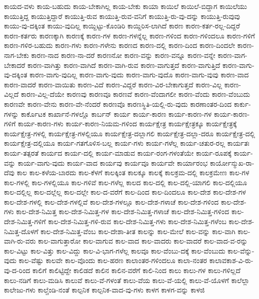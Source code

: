 {ಕಾಯದ-ವಳು
ಕಾಯ-ಬಹುದು
ಕಾಯ-ಬೇಕಾಗಿಲ್ಲ
ಕಾಯ-ಬೇಕು
ಕಾಯಾ
ಕಾಯಿಲೆ
ಕಾಯಿಲೆ-ಬಿದ್ದಾಗ
ಕಾಯಿಲೆಯು
ಕಾಯುತ್ತಿದ್ದ
ಕಾಯುತ್ತಿದ್ದಾರೆ
ಕಾಯುತ್ತಿ-ರುವ
ಕಾಯುತ್ತಿ-ರುವ-ವನಿಗೆ
ಕಾಯುತ್ತಿ-ರು-ವು-ದನ್ನು
ಕಾಯುತ್ತಿ-ರುವುವು
ಕಾಯು-ವು-ದಕ್ಕಿಂತ
ಕಾಯು-ವುದಿಲ್ಲ
ಕಾಯ್ದಿಟ್ಟು-ಕೊಂಡಿರಿ
ಕಾಯ್ದಿರಿಸ-ಲಾಗಿದೆ
ಕಾರಣ
ಕಾರಣ-ಕರ್ತ-ರಲ್ಲ-ದಿದ್ದರೆ
ಕಾರಣ-ಕರ್ತರು
ಕಾರಣಕ್ಕಾಗಿ
ಕಾರಣಕ್ಕೆ
ಕಾರಣ-ಗಳ
ಕಾರಣ-ಗಳನ್ನೆಲ್ಲ
ಕಾರಣ-ಗಳಿಂದ
ಕಾರಣ-ಗಳಿಂದಲೂ
ಕಾರಣ-ಗಳಿಗೆ
ಕಾರಣ-ಗಳಿರ-ಬಹುದು
ಕಾರಣ-ಗಳು
ಕಾರಣ-ಗಳೇನು
ಕಾರಣದ
ಕಾರಣ-ದಲ್ಲಿ
ಕಾರಣ-ದಿಂದ
ಕಾರಣ-ದಿಂದಲೇ
ಕಾರಣ-ನಾಗ-ಬೇಕು
ಕಾರಣ-ನಾದ
ಕಾರಣ-ನಾ-ದರೆ
ಕಾರಣನೋ
ಕಾರಣ-ವನ್ನು
ಕಾರಣ-ವನ್ನೂ
ಕಾರಣ-ವನ್ನೇ
ಕಾರಣ-ವಾಗ-ಬೇಕಾದರೆ
ಕಾರಣ-ವಾಗಿತ್ತು
ಕಾರಣ-ವಾಗಿದೆ
ಕಾರಣ-ವಾಗಿ-ರುವ
ಕಾರಣ-ವಾಗುತ್ತದೆ
ಕಾರಣ-ವಾಗುತ್ತಿದೆ
ಕಾರಣ-ವಾಗು-ವು-ದಕ್ಕಿಂತ
ಕಾರಣ-ವಾಗು-ವುದಿಲ್ಲ
ಕಾರಣ-ವಾಗು-ವುದು
ಕಾರಣ-ವಾಗು-ವುದೊ
ಕಾರಣ-ವಾಗು-ವುವು
ಕಾರಣ-ವಾದ
ಕಾರಣ-ವಾದರೆ
ಕಾರಣ-ವಾಯಿತು
ಕಾರಣ-ವಿದೆ
ಕಾರಣ-ವಿದ್ದರೆ
ಕಾರಣ-ವಿರ-ಬೇಕಾಗುತ್ತದೆ
ಕಾರಣ-ವಿಲ್ಲ
ಕಾರಣ-ವಿಲ್ಲದೆ
ಕಾರಣ-ವಿಲ್ಲ-ದೆಯೇ
ಕಾರಣವು
ಕಾರಣವೂ
ಕಾರಣವೆ
ಕಾರಣ-ವೆಂದಾಗಲೀ
ಕಾರಣ-ವೆಂದು
ಕಾರಣ-ವೆಂಬುದು
ಕಾರಣವೇ
ಕಾರಣ-ವೇನು
ಕಾರಣ-ವೇ-ನೆಂದರೆ
ಕಾರಣವೊ
ಕಾರಣಸ್ಥಿತಿ-ಯಲ್ಲಿ-ರು-ವುದು
ಕಾರಣಾಂತರ-ದಿಂದ
ಕಾರ್ಕು-ಗಳನ್ನು
ಕಾರ್ಕೊಟಕ
ಕಾರ್ಖಾನೆ-ಗಳಲ್ಲೊ
ಕಾರ್ಬನ್
ಕಾರ್ಯ
ಕಾರ್ಯ-ಕಾರಣ
ಕಾರ್ಯ-ಕಾರಣ-ಗಳ
ಕಾರ್ಯ-ಕಾರಣ-ಗಳಿಗೆ
ಕಾರ್ಯ-ಕಾರಣ-ಗಳು
ಕಾರ್ಯ-ಕಾರಣ-ನಿಯಮ-ಗಳಿಂದ
ಕಾರ್ಯಕ್ಷೇತ್ರ
ಕಾರ್ಯಕ್ಷೇತ್ರಕ್ಕೂ
ಕಾರ್ಯಕ್ಷೇತ್ರಕ್ಕೆ
ಕಾರ್ಯಕ್ಷೇತ್ರ-ಗಳಲ್ಲಿ
ಕಾರ್ಯಕ್ಷೇತ್ರ-ಗಳಲ್ಲಿಯೂ
ಕಾರ್ಯಕ್ಷೇತ್ರ-ದಲ್ಲಾಗಲಿ
ಕಾರ್ಯಕ್ಷೇತ್ರ-ದಲ್ಲಾ-ದರೂ
ಕಾರ್ಯಕ್ಷೇತ್ರ-ದಲ್ಲಿ
ಕಾರ್ಯಕ್ಷೇತ್ರ-ದಲ್ಲಿಯೂ
ಕಾರ್ಯ-ಗತಗೊಳಿಸ-ಬಲ್ಲ
ಕಾರ್ಯ-ಗಳು
ಕಾರ್ಯ-ಗಳೆಲ್ಲ
ಕಾರ್ಯ-ಚತುರ-ರಲ್ಲ
ಕಾರ್ಯತಃ
ಕಾರ್ಯ-ತತ್ಪರತೆ
ಕಾರ್ಯದ
ಕಾರ್ಯ-ದಲ್ಲಿ
ಕಾರ್ಯ-ಮಾಡುವ
ಕಾರ್ಯ-ರಂಗ-ಗಳಂತೆಯೇ
ಕಾರ್ಯ-ರೂಪಕ್ಕೆ
ಕಾರ್ಯ-ವನ್ನು
ಕಾರ್ಯ-ವಾಗು-ವುದು
ಕಾರ್ಯ-ವಾದ
ಕಾರ್ಯವು
ಕಾರ್ಯವೂ
ಕಾರ್ಯವೇ
ಕಾರ್ಯಾರಂಭ
ಕಾರ್ಯೋನ್ಮುಖ-ರಾ-ದೆವು
ಕಾಲ
ಕಾಲ-ಕಳೆಯ-ಬಾರದು
ಕಾಲ-ಕೆಳಗೆ
ಕಾಲಕ್ಕಿಂತ
ಕಾಲಕ್ಕೂ
ಕಾಲಕ್ಕೆ
ಕಾಲಕ್ರಮ-ದಲ್ಲಿ
ಕಾಲಕ್ರಮೇಣ
ಕಾಲ-ಗಳ
ಕಾಲ-ಗಳಲ್ಲಿ
ಕಾಲ-ಗಳಲ್ಲಿಯೂ
ಕಾಲ-ಗಳಿವೆ
ಕಾಲ-ಗಳೆಲ್ಲ
ಕಾಲದ
ಕಾಲ-ದಲ್ಲಿ
ಕಾಲ-ದಲ್ಲಿ-ಯಾಗಲಿ
ಕಾಲ-ದಲ್ಲಿಯೂ
ಕಾಲ-ದಲ್ಲಿಲ್ಲ
ಕಾಲ-ದಲ್ಲೆಲ್ಲ
ಕಾಲ-ದಲ್ಲೇ
ಕಾಲ-ದ-ವರೆಗೆ
ಕಾಲ-ದಿಂದ
ಕಾಲ-ದಿಂದಲೂ
ಕಾಲ-ದೇಶ
ಕಾಲ-ದೇಶ-ಗಳ
ಕಾಲ-ದೇಶ-ಗಳಲ್ಲಿ
ಕಾಲ-ದೇಶ-ಗಳಲ್ಲಿವೆ
ಕಾಲ-ದೇಶ-ಗಳಲ್ಲೂ
ಕಾಲ-ದೇಶ-ಗಳಾಚೆ
ಕಾಲ-ದೇಶ-ಗಳಿಂದ
ಕಾಲ-ದೇಶ-ಗಳು
ಕಾಲ-ದೇಶ-ನಿಮಿತ್ತ
ಕಾಲ-ದೇಶ-ನಿಮಿತ್ತ-ಗಳ
ಕಾಲ-ದೇಶ-ನಿಮಿತ್ತ-ಗಳಾಚೆ
ಕಾಲ-ದೇಶ-ನಿಮಿತ್ತ-ಗಳಿಂದ
ಕಾಲ-ದೇಶ-ನಿಮಿತ್ತ-ಗಳಿಗೆ
ಕಾಲ-ದೇಶ-ನಿಮಿತ್ತ-ಗಳಿ-ರುವ
ಕಾಲ-ದೇಶ-ನಿಮಿತ್ತ-ಗಳು
ಕಾಲ-ದೇಶ-ನಿಮಿತ್ತ-ಗಳೆಂಬ
ಕಾಲ-ದೇಶ-ನಿಮಿತ್ತ-ದೊಳಗೆ
ಕಾಲ-ದೇಶ-ನಿಮಿತ್ತ-ವೆಂಬ
ಕಾಲ-ದೇಶಾ-ತೀತ
ಕಾಲನ್ನು
ಕಾಲ-ಮೇಲೆ
ಕಾಲ-ವನ್ನು
ಕಾಲ-ವಾಗಿ
ಕಾಲ-ವಾಗಿ-ರು-ವರು
ಕಾಲ-ವಾಗುತ್ತಾರೋ
ಕಾಲ-ವಾಗುವ
ಕಾಲ-ವಾದ
ಕಾಲ-ವಾದರು
ಕಾಲ-ವಾದರೆ
ಕಾಲ-ವಾದ-ವ-ರನ್ನು
ಕಾಲ-ವಿಟ್ಟು
ಕಾಲ-ವಿತ್ತು
ಕಾಲ-ವಿದ್ದು
ಕಾಲ-ವಿ-ಭಾಗ-ಗಳೆಲ್ಲ
ಕಾಲವೂ
ಕಾಲ-ವೆಂಬು-ದಕ್ಕೆ
ಕಾಲ-ವೆಂಬುದು
ಕಾಲ-ವೆನ್ನು-ವುದು
ಕಾಲ-ವೆಷ್ಟು
ಕಾಲವೇ
ಕಾಲ-ವೊಂದು
ಕಾಲ-ಹರಣ
ಕಾಲಾಂತರ-ಗಳಿಂದಲೂ
ಕಾಲಾ-ನಂತರ
ಕಾಲಾವಕಾಶ-ವಿ-ರು-ವು-ದ-ರಿಂದ
ಕಾಲಿಗೆ
ಕಾಲಿಟ್ಟಿದ್ದೇ
ಕಾಲಿಡದೆ
ಕಾಲಿನ
ಕಾಲಿನ-ವರೆಗೆ
ಕಾಲಿ-ನಿಂದ
ಕಾಲು
ಕಾಲು-ಗಳ
ಕಾಲು-ಗಳಿಲ್ಲದೆ
ಕಾಲು-ನಡಿಗೆ
ಕಾಲು-ಮಡಿಸಿ
ಕಾಲುವೆ
ಕಾಲು-ವೆ-ಗಳಂತೆ
ಕಾಲು-ವೆಯ
ಕಾಲು-ವೆ-ಯಲ್ಲಿ
ಕಾಲು-ವೆ-ಯೊಳಗೆ
ಕಾಲೆಲ್ಲಾ
ಕಾಲೇಜು-ಗಳು
ಕಾಲ್ಚೆಂಡಿ-ನಂತೆ
ಕಾಲ್ಪನಿಕ
ಕಾಲ್ಪನಿಕ-ವಾದ-ವು-ಗಳು
ಕಾಳಗ
ಕಾಳಗ-ವನ್ನು
ಕಾಳಜಿ
}
